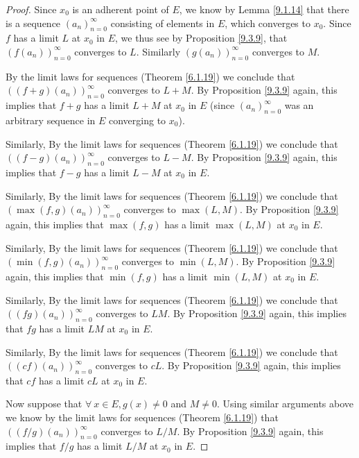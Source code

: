 \begin{proof}
    Since \(x_0\) is an adherent point of \(E\), we know by Lemma \ref{9.1.14} that there is a sequence \((a_n)_{n = 0}^\infty\) consisting of elements in \(E\), which converges to \(x_0\).
    Since \(f\) has a limit \(L\) at \(x_0\) in \(E\), we thus see by Proposition \ref{9.3.9}, that \((f(a_n))_{n = 0}^\infty\) converges to \(L\).
    Similarly \((g(a_n))_{n = 0}^\infty\) converges to \(M\).

    By the limit laws for sequences (Theorem \ref{6.1.19}) we conclude that \(((f + g)(a_n))_{n = 0}^\infty\) converges to \(L + M\).
    By Proposition \ref{9.3.9} again, this implies that \(f + g\) has a limit \(L + M\) at \(x_0\) in \(E\)
    (since \((a_n)_{n = 0}^\infty\) was an arbitrary sequence in \(E\) converging to \(x_0\)).

    Similarly, By the limit laws for sequences (Theorem \ref{6.1.19}) we conclude that \(((f - g)(a_n))_{n = 0}^\infty\) converges to \(L - M\).
    By Proposition \ref{9.3.9} again, this implies that \(f - g\) has a limit \(L - M\) at \(x_0\) in \(E\).

    Similarly, By the limit laws for sequences (Theorem \ref{6.1.19}) we conclude that \((\max(f, g)(a_n))_{n = 0}^\infty\) converges to \(\max(L, M)\).
    By Proposition \ref{9.3.9} again, this implies that \(\max(f, g)\) has a limit \(\max(L, M)\) at \(x_0\) in \(E\).

    Similarly, By the limit laws for sequences (Theorem \ref{6.1.19}) we conclude that \((\min(f, g)(a_n))_{n = 0}^\infty\) converges to \(\min(L, M)\).
    By Proposition \ref{9.3.9} again, this implies that \(\min(f, g)\) has a limit \(\min(L, M)\) at \(x_0\) in \(E\).

    Similarly, By the limit laws for sequences (Theorem \ref{6.1.19}) we conclude that \(((fg)(a_n))_{n = 0}^\infty\) converges to \(LM\).
    By Proposition \ref{9.3.9} again, this implies that \(fg\) has a limit \(LM\) at \(x_0\) in \(E\).

    Similarly, By the limit laws for sequences (Theorem \ref{6.1.19}) we conclude that \(((cf)(a_n))_{n = 0}^\infty\) converges to \(cL\).
    By Proposition \ref{9.3.9} again, this implies that \(cf\) has a limit \(cL\) at \(x_0\) in \(E\).

    Now suppose that \(\forall\ x \in E, g(x) \neq 0\) and \(M \neq 0\).
    Using similar arguments above we know by the limit laws for sequences (Theorem \ref{6.1.19}) that \(((f / g)(a_n))_{n = 0}^\infty\) converges to \(L / M\).
    By Proposition \ref{9.3.9} again, this implies that \(f / g\) has a limit \(L / M\) at \(x_0\) in \(E\).
\end{proof}


